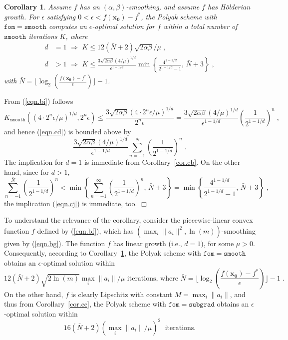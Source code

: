 \documentclass[reqno, 11pt]{amsart}
\newtheorem{cor}[prop]{Corollary}
\numberwithin{equation}{section}
\newcommand{\shrink}[1]{ {\scriptstyle {\textstyle {#1} } } }
\newcommand{\smfrac}[2]{ \shrink{ \frac{#1}{#2} } }
\newcommand{\fom}{\mathtt{fom}}
\newcommand{\subgrad}{\mathtt{subgrad}}
\newcommand{\smooth}{\mathtt{smooth}}
\begin{document}
\begin{cor}  \label{cor.ce} 
Assume $ f $ has an $ (\alpha,\beta) $-smoothing, and assume $ f $ has H\"{o}lderian growth.  For $ \epsilon $ satisfying $ 0 < \epsilon < f( \mathbf{x_0}) - f^* $, the Polyak scheme with $ \fom = \smooth $ computes an $ \epsilon $-optimal solution for $ f $ within a total number of $ \smooth $ iterations $ K $, where
\begin{align}
  d & = 1  \, \,   \Rightarrow \, \,   K \leq   12 (\bar{N}+2) \sqrt{ 2 \alpha \beta } / \mu  \; ,     \label{eqn.ci} \\
  d & > 1 \, \,  \Rightarrow \, \,  K \leq  \frac{ 3  \sqrt{2 \alpha \beta} (4/ \mu)^{1/d}}{\epsilon^{ 1 - 1/d}}   \min \left\{ \frac{4^{ 1 - 1/d}}{2^{1 - 1/d} - 1}, \,  \bar{N} + 3 \right\}  \; , \label{eqn.cj} 
  \end{align}
with $ \bar{N} = \lfloor \log_2 \left(  \frac{f( \mathbf{x_0}) - f^*}{\epsilon} \right) \rfloor - 1 $.    
    \end{cor}
From (\ref{eqn.bi})  follows
\[  
		 K_{\smooth}( (4 \cdot 2^n \epsilon/ \mu)^{1/d}, 2^n \epsilon)  \leq \frac{3 \sqrt{2 \alpha \beta} (4 \cdot 2^n \epsilon/\mu)^{1/d}}{2^n \epsilon}  = \frac{3 \sqrt{2 \alpha \beta } (4/\mu)^{1/d}}{\epsilon^{1 - 1/d}} \left( \frac{1}{2^{1 - 1/d } }\right)^n             \; ,              
\] 
and hence (\ref{eqn.cd})  is bounded above by 
\[  
  \frac{ 3 \sqrt{2 \alpha \beta } (4/ \mu)^{1/d}}{ \epsilon^{ 1 - 1/d}}  \sum_{n = -1}^{\bar{N}}  \left( \frac{1}{2^{1 - 1/d}} \right)^n \; . 
\] 
The implication for $ d = 1 $  is immediate from Corollary~\ref{cor.cb}. On the other hand, since for $ d > 1 $, 
\[    
   \sum_{n=-1}^{\bar{N}} \left(  \frac{1}{ 2^{1 - 1/d  }} \right)^n < \min \left\{ \sum_{n=-1}^{\infty } \left(  \frac{1}{ 2^{1 - 1/d}}\right)^n, \, \bar{N} + 3 \right\} 
            = \min \left\{ \frac{4^{ 1 - 1/d}}{2^{1 - 1/d} - 1}, \,  \bar{N} + 3 \right\} \; ,
\] 
the implication (\ref{eqn.cj})  is immediate, too.  \hfill $ \Box $
 
To understand the relevance of the corollary, consider the piecewise-linear convex function $ f $ defined by (\ref{eqn.bf}), which has $ ( \max_i \| a_i \|^2, \ln (m)) $-smoothing given by (\ref{eqn.bg}). The function $ f $ has linear growth (i.e., $ d = 1 $), for some $ \mu > 0 $. Consequently, according to Corollary~\ref{cor.ce}, the Polyak scheme with $ \fom = \smooth $ obtains an $ \epsilon $-optimal solution within
\[  12 ( \bar{N} + 2) \sqrt{2 \ln(m)} \max_i \| a_i \|  / \mu  \textrm{ iterations, where } \bar{N} = \lfloor \log_2 \left(  \smfrac{f( \mathbf{x_0}) - f^*}{\epsilon} \right) \rfloor - 1 \; . \]
On the other hand, $ f $  is clearly Lipschitz with constant $ M = \max_i \| a_i \| $, and thus from Corollary~\ref{cor.cc}, the Polyak scheme with $ \fom = \subgrad $ obtains an $ \epsilon $-optimal solution within
\[ 16 (\bar{N}+2) (\max_i \| a_i \|/ \mu)^2 \; \textrm{ iterations}  . \]
\end{document}
